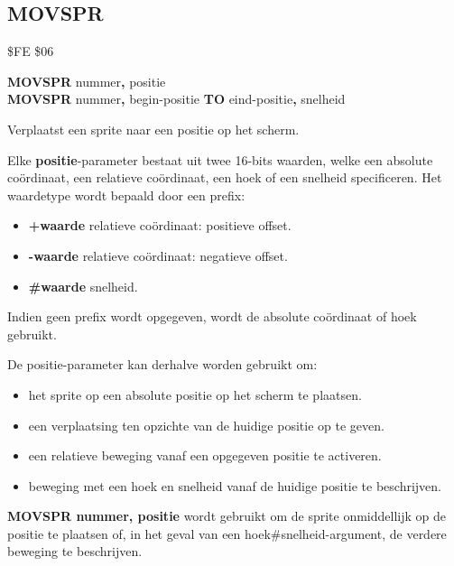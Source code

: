 \subsection{MOVSPR}
\begin{description}[leftmargin=2cm,style=nextline]
\item [Token:]    \$FE \$06

\item [Formaat:]  {\bf MOVSPR} nummer{\bf,} positie \\
                  {\bf MOVSPR} nummer{\bf,} begin-positie {\bf TO} eind-positie{\bf,} snelheid

\item [Gebruik:]    Verplaatst een sprite naar een positie op het scherm.

                  Elke {\bf positie}-parameter bestaat uit twee 16-bits waarden, welke een absolute coördinaat, een relatieve coördinaat, een hoek of een snelheid specificeren. Het waardetype wordt bepaald door een prefix:

                  \begin{itemize}
                     \item {\bf +waarde} relatieve coördinaat: positieve offset.
                     \item {\bf -waarde} relatieve coördinaat: negatieve offset.
                     \item {\bf \#waarde} snelheid.
                  \end{itemize}

                  Indien geen prefix wordt opgegeven, wordt de absolute coördinaat of hoek gebruikt.

                  De positie-parameter kan derhalve worden gebruikt om:
                  \begin{itemize}
                     \item het sprite op een absolute positie op het scherm te plaatsen.
                     \item een verplaatsing ten opzichte van de huidige positie op te geven.
                     \item een relatieve beweging vanaf een opgegeven positie te activeren.
                     \item beweging met een hoek en snelheid vanaf de huidige positie te beschrijven.
                  \end{itemize}

                  {\bf MOVSPR nummer, positie} wordt gebruikt om de sprite onmiddellijk op de positie te plaatsen of, in het geval van een hoek\#snelheid-argument, de verdere beweging te beschrijven.


\end{description}
